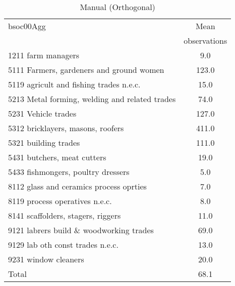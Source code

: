 \begin{table}
	\centering
	\caption{Manual (Orthogonal)}
	\begin{tabular}{lc}
	\toprule	
		
bsoc00Agg&Mean \\
&observations \\
\hline
1211 farm managers&9.0 \\
5111 Farmers, gardeners and ground women&123.0 \\
5119 agricult and fishing trades n.e.c.&15.0 \\
5213 Metal forming, welding and related trades&74.0 \\
5231 Vehicle trades&127.0 \\
5312 bricklayers, masons, roofers&411.0 \\
5321 building trades&111.0 \\
5431 butchers, meat cutters&19.0 \\
5433 fishmongers, poultry dressers&5.0 \\
8112 glass and ceramics process oprties&7.0 \\
8119 process operatives n.e.c.&8.0 \\
8141 scaffolders, stagers, riggers&11.0 \\
9121 labrers build \& woodworking trades&69.0 \\
9129 lab oth const trades n.e.c.&13.0 \\
9231 window cleaners&20.0 \\
Total&68.1 \\
\bottomrule
\bottomrule
\end{tabular}
\end{table}
